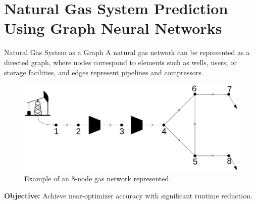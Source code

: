 \documentclass[hyperref={colorlinks,citecolor=blue,linkcolor=blue,urlcolor=blue}]{beamer}
\begin{document}
%
%

\section{Natural Gas System Prediction Using Graph Neural Networks}


\begin{frame}{Natural Gas System as a Graph}
    \footnotesize
    \justifying
    A natural gas network can be represented as a directed graph, 
    where nodes correspond to elements such as wells, users, or storage facilities, 
    and edges represent pipelines and compressors.
    \begin{figure}
    \begin{center}
        \includegraphics[width=0.7\linewidth]{figures/8_node_system.png}
        \caption{\footnotesize Example of an 8-node gas network represented.}
    \end{center}
    \end{figure}

    \vspace{0.3cm}
    \textbf{Objective:} Achieve near-optimizer accuracy with significant runtime reduction.
\end{frame}
\end{document}
